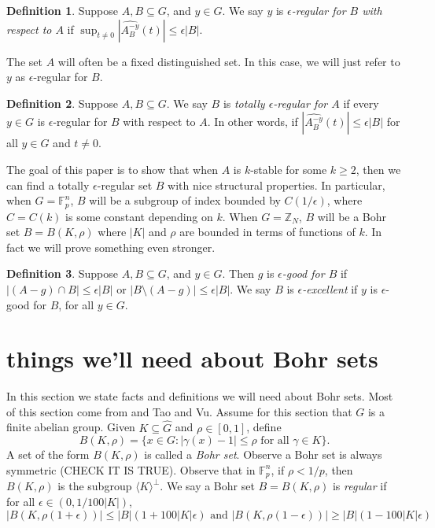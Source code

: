 \documentclass[11pt]{article}
\theoremstyle{definition}
\newtheorem{definition}{Definition}
\begin{document}
\begin{definition}
Suppose $A, B\subseteq G$, and $y\in G$.  We say $y$ is \emph{$\epsilon$-regular for $B$ with respect to $A$} if $\sup_{t\neq 0}|\widehat{A_B^{-y}}(t)|\leq \epsilon |B|$.
\end{definition}

The set $A$ will often be a fixed distinguished set.  In this case, we will just refer to $y$ as $\epsilon$-regular for $B$.

\begin{definition}
Suppose $A, B\subseteq G$.  We say $B$ is \emph{totally $\epsilon$-regular for $A$} if every $y\in G$ is $\epsilon$-regular for $B$ with respect to $A$.  In other words, if $|\widehat{A_B^{-y}}(t)|\leq \epsilon|B|$ for all $y\in G$ and $t\neq 0$.
\end{definition}

The goal of this paper is to show that when $A$ is $k$-stable for some $k\geq 2$, then we can find a totally $\epsilon$-regular set $B$ with nice structural properties.  In particular, when $G=\mathbb{F}_p^n$, $B$ will be a subgroup of index bounded by $C(1/\epsilon)$, where $C=C(k)$ is some constant depending on $k$.  When $G=\mathbb{Z}_N$, $B$ will be a Bohr set $B=B(K,\rho)$ where $|K|$ and $\rho$ are bounded in terms of functions of $k$. In fact we will prove something even stronger.  

\begin{definition}
Suppose $A, B\subseteq G$, and $y\in G$. Then $g$ is \emph{$\epsilon$-good for $B$} if $|(A-g)\cap B|\leq \epsilon |B|$ or $|B\setminus (A-g)|\leq \epsilon |B|$. We say $B$ is \emph{$\epsilon$-excellent} if $y$ is $\epsilon$-good for $B$, for all $y\in G$.
\end{definition}


\section{things we'll need about Bohr sets}
In this section we state facts and definitions we will need about Bohr sets.  Most of this section come from \cite{GW2011} and Tao and Vu.  Assume for this section that $G$ is a finite abelian group.  Given $K\subseteq \widehat{G}$ and $\rho\in [0,1]$, define 
$$
B(K,\rho)=\{x\in G: |\gamma(x)-1|\leq \rho \text{ for all $\gamma\in K$}\}.
$$
A set of the form $B(K,\rho)$ is called a \emph{Bohr set}.  Observe a Bohr set is always symmetric (CHECK IT IS TRUE).  Observe that in $\mathbb{F}_p^n$, if $\rho<1/p$, then $B(K,\rho)$ is the subgroup $\langle K\rangle ^{\perp}$. We say a Bohr set $B=B(K,\rho)$ is \emph{regular} if for all $\epsilon \in (0,1/100|K|)$, 
$$
|B(K,\rho(1+\epsilon))|\leq |B|(1+100|K|\epsilon) \text{ and }|B(K,\rho(1-\epsilon))|\geq |B|(1-100|K|\epsilon) 
$$
\end{document}
